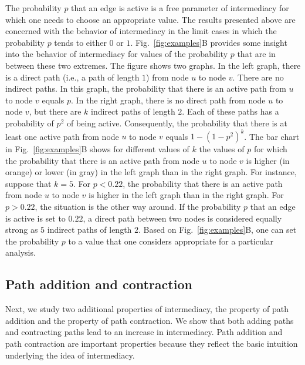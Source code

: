 \documentclass[9pt,twocolumn,twoside]{pnas-alt} %
\theoremstyle{definition}
\newcommand{\subfigref}[2]{Fig.~\ref{fig:#1}#2\xspace}
\begin{document}
The probability $p$ that an edge is active is a free parameter of intermediacy for which one needs to choose an appropriate value. The results presented above are concerned with the behavior of intermediacy in the limit cases in which the probability $p$ tends to either $0$ or $1$. \subfigref{examples}{B} provides some insight into the behavior of intermediacy for values of the probability $p$ that are in between these two extremes. The figure shows two graphs. In the left graph, there is a direct path (i.e., a path of length $1$) from node $u$ to node $v$. There are no indirect paths. In this graph, the probability that there is an active path from $u$ to node $v$ equals $p$. In the right graph, there is no direct path from node $u$ to node $v$, but there are $k$ indirect paths of length $2$. Each of these paths has a probability of $p^2$ of being active. Consequently, the probability that there is at least one active path from node $u$ to node $v$ equals $1 - (1 - p^2)^k$. The bar chart in \subfigref{examples}{B} shows for different values of $k$ the values of $p$ for which the probability that there is an active path from node $u$ to node $v$ is higher (in orange) or lower (in gray) in the left graph than in the right graph. For instance, suppose that $k = 5$. For $p < 0.22$, the probability that there is an active path from node $u$ to node $v$ is higher in the left graph than in the right graph. For $p > 0.22$, the situation is the other way around. If the probability $p$ that an edge is active is set to $0.22$, a direct path between two nodes is considered equally strong as $5$ indirect paths of length $2$. Based on \subfigref{examples}{B}, one can set the probability $p$ to a value that one considers appropriate for a particular analysis.

%
%

\subsection*{\label{sec:path}Path addition and contraction}

Next, we study two additional properties of intermediacy, the property of path addition and the property of path contraction. We show that both adding paths and contracting paths lead to an increase in intermediacy. Path addition and path contraction are important properties because they reflect the basic intuition underlying the idea of intermediacy.
\end{document}
